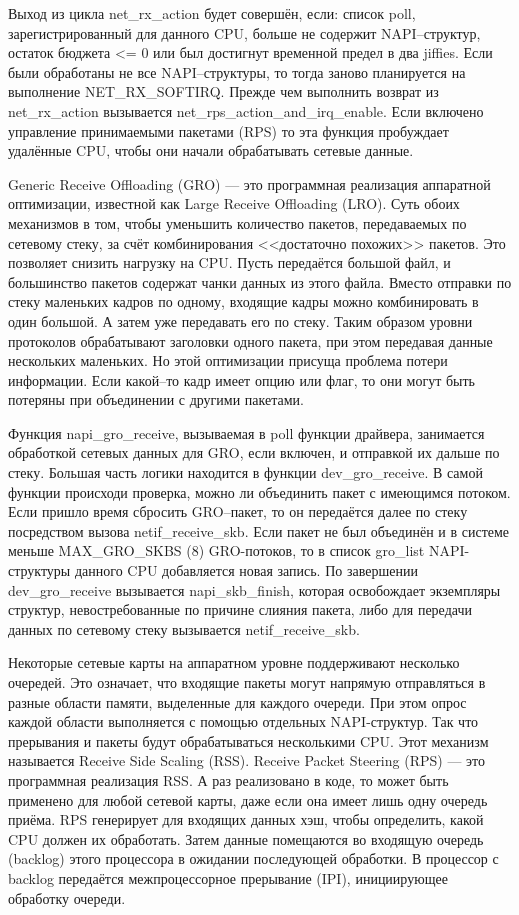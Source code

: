 Выход из цикла net\_rx\_action будет совершён, если: список poll, зарегистрированный для данного CPU, больше не содержит NAPI--структур, остаток бюджета <= 0 или был достигнут временной предел в два jiffies. Если были обработаны не все NAPI--структуры, то тогда заново планируется на выполнение NET\_RX\_SOFTIRQ. Прежде чем выполнить возврат из net\_rx\_action вызывается net\_rps\_action\_and\_irq\_enable. Если включено управление принимаемыми пакетами (RPS) то эта функция пробуждает удалённые CPU, чтобы они начали обрабатывать сетевые данные.

Generic Receive Offloading (GRO) — это программная реализация аппаратной оптимизации, известной как Large Receive Offloading (LRO). Суть обоих механизмов в том, чтобы уменьшить количество пакетов, передаваемых по сетевому стеку, за счёт комбинирования <<достаточно похожих>> пакетов. Это позволяет снизить нагрузку на CPU. Пусть передаётся большой файл, и большинство пакетов содержат чанки данных из этого файла. Вместо отправки по стеку маленьких кадров по одному, входящие кадры можно комбинировать в один большой. А затем уже передавать его по стеку. Таким образом уровни протоколов обрабатывают заголовки одного пакета, при этом передавая данные нескольких маленьких. Но этой оптимизации присуща проблема потери информации. Если какой--то кадр имеет опцию или флаг, то они могут быть потеряны при объединении с другими пакетами.

Функция napi\_gro\_receive, вызываемая в poll функции драйвера, занимается обработкой сетевых данных для GRO, если включен, и отправкой их дальше по стеку. Большая часть логики находится в функции dev\_gro\_receive. В самой функции происходи проверка, можно ли объединить пакет с имеющимся потоком. Если пришло время сбросить GRO--пакет, то он передаётся далее по стеку посредством вызова netif\_receive\_skb. Если пакет не был объединён и в системе меньше MAX\_GRO\_SKBS (8) GRO-потоков, то в список gro\_list NAPI-структуры данного CPU добавляется новая запись. По завершении dev\_gro\_receive вызывается napi\_skb\_finish, которая освобождает экземпляры структур, невостребованные по причине слияния пакета, либо для передачи данных по сетевому стеку вызывается netif\_receive\_skb.

Некоторые сетевые карты на аппаратном уровне поддерживают несколько очередей. Это означает, что входящие пакеты могут напрямую отправляться в разные области памяти, выделенные для каждого очереди. При этом опрос каждой области выполняется с помощью отдельных NAPI-структур. Так что прерывания и пакеты будут обрабатываться несколькими CPU. Этот механизм называется Receive Side Scaling (RSS). Receive Packet Steering (RPS) --- это программная реализация RSS. А раз реализовано в коде, то может быть применено для любой сетевой карты, даже если она имеет лишь одну очередь приёма. RPS генерирует для входящих данных хэш, чтобы определить, какой CPU должен их обработать. Затем данные помещаются во входящую очередь (backlog) этого процессора в ожидании последующей обработки. В процессор с backlog передаётся межпроцессорное прерывание (IPI), инициирующее обработку очереди.

